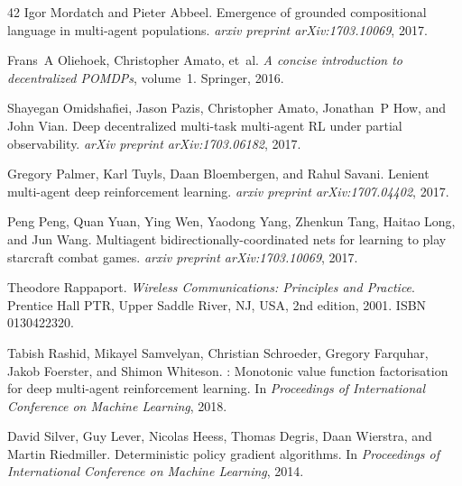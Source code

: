 \documentclass{article} %
\begin{document}
\begin{thebibliography}{42}
Igor Mordatch and Pieter Abbeel.
\newblock Emergence of grounded compositional language in multi-agent
  populations.
\newblock \emph{arxiv preprint arXiv:1703.10069}, 2017.

Frans~A Oliehoek, Christopher Amato, et~al.
\newblock \emph{A concise introduction to decentralized POMDPs}, volume~1.
\newblock Springer, 2016.

Shayegan Omidshafiei, Jason Pazis, Christopher Amato, Jonathan~P How, and John
  Vian.
\newblock Deep decentralized multi-task multi-agent {RL} under partial
  observability.
\newblock \emph{arXiv preprint arXiv:1703.06182}, 2017.

Gregory Palmer, Karl Tuyls, Daan Bloembergen, and Rahul Savani.
\newblock Lenient multi-agent deep reinforcement learning.
\newblock \emph{arxiv preprint arXiv:1707.04402}, 2017.

Peng Peng, Quan Yuan, Ying Wen, Yaodong Yang, Zhenkun Tang, Haitao Long, and
  Jun Wang.
\newblock Multiagent bidirectionally-coordinated nets for learning to play
  starcraft combat games.
\newblock \emph{arxiv preprint arXiv:1703.10069}, 2017.

Theodore Rappaport.
\newblock \emph{Wireless Communications: Principles and Practice}.
\newblock Prentice Hall PTR, Upper Saddle River, NJ, USA, 2nd edition, 2001.
\newblock ISBN 0130422320.

Tabish Rashid, Mikayel Samvelyan, Christian Schroeder, Gregory Farquhar, Jakob
  Foerster, and Shimon Whiteson.
: Monotonic value function factorisation for deep multi-agent
  reinforcement learning.
\newblock In \emph{Proceedings of International Conference on Machine
  Learning}, 2018.

David Silver, Guy Lever, Nicolas Heess, Thomas Degris, Daan Wierstra, and
  Martin Riedmiller.
\newblock Deterministic policy gradient algorithms.
\newblock In \emph{Proceedings of International Conference on Machine
  Learning}, 2014.


\end{thebibliography}
\end{document}
